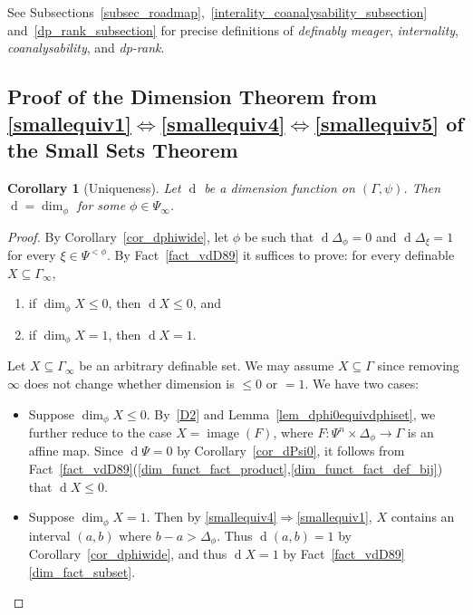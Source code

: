 \documentclass[11pt]{amsart}
\theoremstyle{plain}
\newtheorem{cor}[thm]{Corollary}
\theoremstyle{definition}
\numberwithin{equation}{section}
\newcommand\0{\varnothing}
\begin{document}
\noindent
See Subsections~\ref{subsec_roadmap},~\ref{interality_coanalysability_subsection} and~\ref{dp_rank_subsection} for precise definitions of \emph{definably meager}, \emph{internality}, \emph{coanalysability}, and \emph{dp-rank}. 



\subsection{Proof of the Dimension Theorem from \texorpdfstring{\eqref{smallequiv1}$\Leftrightarrow$\eqref{smallequiv4}$\Leftrightarrow$\eqref{smallequiv5}}{(1)↔(4)↔(5)} of the Small Sets Theorem}\label{subsec_dimthmproof}


\begin{cor}[Uniqueness]\label{dimension_theorem_uniqueness}
Let $\operatorname{d}$ be a dimension function on $(\Gamma,\psi)$. Then $\operatorname{d}=\dim_{\phi}$ for some $\phi\in\Psi_{\infty}$.
\end{cor}
\begin{proof}
By Corollary~\ref{cor_dphiwide}, let $\phi$ be such that $\operatorname{d}\Delta_{\phi}=0$ and $\operatorname{d}\Delta_{\xi}=1$ for every $\xi\in\Psi^{<\phi}$. By Fact~\ref{fact_vdD89} it suffices to prove: for every definable $X\subseteq\Gamma_{\infty}$,
\begin{enumerate}[label=(\alph*)]
\item if $\dim_{\phi}X\leq 0$, then $\operatorname{d}X\leq 0$, and
\item if $\dim_{\phi}X=1$, then $\operatorname{d}X=1$.
\end{enumerate}
Let $X\subseteq\Gamma_{\infty}$ be an arbitrary definable set. We may assume $X\subseteq\Gamma$ since removing $\infty$ does not change whether dimension is $\leq0$ or $=1$. We have two cases:
\begin{itemize}
\item Suppose $\dim_{\phi}X\leq 0$. By~\ref{D2} and Lemma~\ref{lem_dphi0equivdphiset}, we further reduce to the case $X=\operatorname{image}(F)$, where $F\colon\Psi^n\times\Delta_{\phi}\to\Gamma$ is an affine map. Since $\operatorname{d}\Psi=0$ by Corollary~\ref{cor_dPsi0}, it follows from  Fact~\ref{fact_vdD89}(\ref{dim_funct_fact_product},\ref{dim_funct_fact_def_bij}) that $\operatorname{d}X\leq0$.
\item Suppose $\dim_{\phi}X=1$. Then by \eqref{smallequiv4}$\Rightarrow$\eqref{smallequiv1}, $X$ contains an interval $(a,b)$ where $b-a>\Delta_{\phi}$. Thus $\operatorname{d}(a,b)=1$ by Corollary~\ref{cor_dphiwide}, and thus $\operatorname{d}X=1$ by Fact~\ref{fact_vdD89}\eqref{dim_fact_subset}. \qedhere
\end{itemize}
\end{proof}
\end{document}
